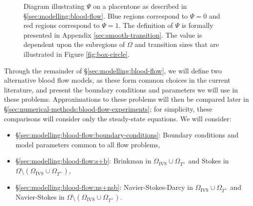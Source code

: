         \begin{figure}
            \centering
            
            \caption{Diagram illustrating $\Psi$ on a placentone as described in \S\ref{sec:modelling:blood-flow}. Blue regions correspond to $\Psi = 0$ and red regions correspond to $\Psi = 1$. The definition of $\Psi$ is formally presented in Appendix \ref{sec:smooth-transition}. The value is dependent upon the subregions of $\Omega$ and transition sizes that are illustrated in Figure \ref{fig:box-circle}.}
            \label{fig:permeability}
        \end{figure}
            
        Through the remainder of \S\ref{sec:modelling:blood-flow}, we will define two alternative blood flow models, as these form common choices in the current literature, and present the boundary conditions and parameters we will use in these problems. Approximations to these problems will then be compared later in \S\ref{sec:numerical-methods:blood-flow-experiments}; for simplicity, these comparisons will consider only the steady-state equations. We will consider:
        \begin{itemize}
            \item \S\ref{sec:modelling:blood-flow:boundary-conditions}: Boundary conditions and model parameters common to all flow problems,
            \item \S\ref{sec:modelling:blood-flow:s+b}: Brinkman in $\Omega_\text{IVS} \cup \Omega_{T^+}$ and Stokes in $\Omega \setminus (\Omega_\text{IVS} \cup \Omega_{T^+})$,
            \item \S\ref{sec:modelling:blood-flow:ns+nsb}: Navier-Stokes-Darcy in $\Omega_\text{IVS} \cup \Omega_{T^+}$ and Navier-Stokes in $\Omega \setminus (\Omega_\text{IVS} \cup \Omega_{T^+})$.
        \end{itemize}

